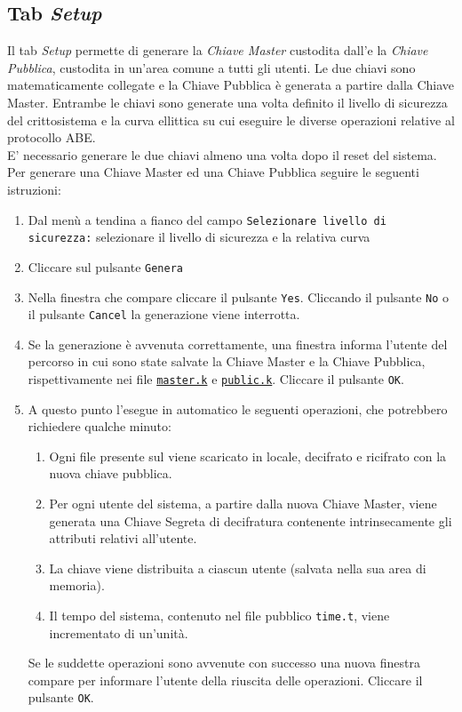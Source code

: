 \documentclass[a4paper,twoside,10pt,openany]{scrbook}
\begin{document}
\subsection{Tab \emph{Setup}}\label{sec:tab_setup}
%
Il tab \emph{Setup} permette di generare la \emph{Chiave Master} custodita dall'\auth e la \emph{Chiave Pubblica}, custodita in un'area comune a tutti gli utenti.
Le due chiavi sono matematicamente collegate 
e la Chiave Pubblica è generata a partire dalla Chiave Master. 
Entrambe le chiavi sono generate una volta definito 
il livello di sicurezza del crittosistema 
e la curva ellittica su cui eseguire le diverse operazioni 
relative al protocollo ABE.\\
E' necessario generare le due chiavi almeno una volta dopo il reset del sistema.\\
Per generare una Chiave Master ed una Chiave Pubblica seguire le seguenti istruzioni:
\begin{enumerate}
 \item Dal menù a tendina a fianco del campo \texttt{Selezionare livello di sicurezza:} selezionare il livello di sicurezza e la relativa curva
 \item Cliccare sul pulsante \texttt{Genera}
 \item Nella finestra che compare cliccare il pulsante \texttt{Yes}. Cliccando il pulsante \texttt{No} o il pulsante \texttt{Cancel} la generazione viene interrotta.
 \item Se la generazione è avvenuta correttamente, 
       una finestra informa l'utente del percorso 
       in cui sono state salvate la Chiave Master e la Chiave Pubblica, 
       rispettivamente nei file \texttt{\hyperref[sec:format_pk]{master.k}} e \texttt{\hyperref[sec:format_pk]{public.k}}.
       Cliccare il pulsante \texttt{OK}.
 \item A questo punto l'\auth esegue in automatico le seguenti operazioni, che potrebbero richiedere qualche minuto:
 \begin{enumerate}
  \item Ogni file presente sul \sa viene scaricato in locale, decifrato e ricifrato con la nuova chiave pubblica.
  \item Per ogni utente del sistema, a partire dalla nuova Chiave Master, viene generata una Chiave Segreta di decifratura contenente intrinsecamente gli attributi relativi all'utente.
  \item La chiave viene distribuita a ciascun utente (salvata nella sua area di memoria).
  \item Il tempo del sistema, contenuto nel file pubblico \texttt{time.t}, 
        viene incrementato di un'unità.
 \end{enumerate}
      Se le suddette operazioni sono avvenute con successo una nuova finestra compare per informare l'utente della riuscita delle operazioni.
      Cliccare il pulsante \texttt{OK}.
\end{enumerate}
%
\end{document}
